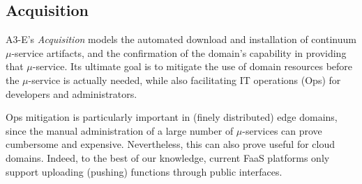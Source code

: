 





\subsection{Acquisition}\label{sec:A3-E-acquisition}

A3-E's \textit{Acquisition} models the automated download and installation of continuum $\mu$-service artifacts, and the confirmation of the domain's capability in providing that $\mu$-service. Its ultimate goal is to mitigate the use of domain resources before the $\mu$-service is actually needed, while also facilitating IT operations (Ops) for developers and administrators. 

Ops mitigation is particularly important in (finely distributed) edge domains, since the manual administration of a large number of $\mu$-services can prove cumbersome and expensive. Nevertheless, this can also prove useful for cloud domains. Indeed, to the best of our knowledge, current FaaS platforms only support uploading (pushing) functions through public interfaces. 

